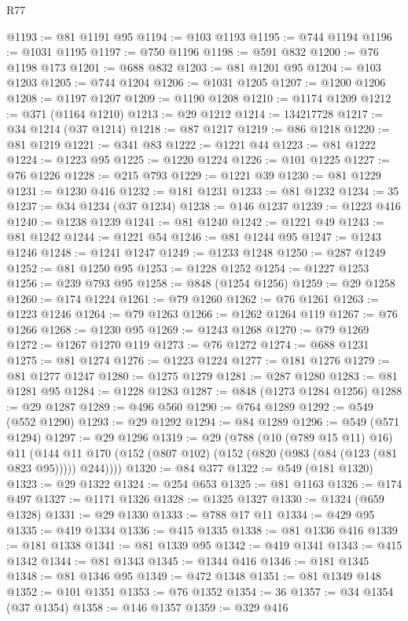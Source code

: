 \begin{lexlean}{R77}
\begin{coremodule}
@1193 := @81 @1191 @95
@1194 := @103 @1193
@1195 := @744 @1194
@1196 := @1031 @1195
@1197 := @750 @1196
@1198 := @591 @832
@1200 := @76 @1198 @173
@1201 := @688 @832
@1203 := @81 @1201 @95
@1204 := @103 @1203
@1205 := @744 @1204
@1206 := @1031 @1205
@1207 := @1200 @1206
@1208 := @1197 @1207
@1209 := @1190 @1208
@1210 := @1174 @1209
@1212 := @371 (@1164 @1210)
@1213 := @29 @1212
@1214 := 134217728
@1217 := @34 @1214 (@37 @1214)
@1218 := @87 @1217
@1219 := @86 @1218
@1220 := @81 @1219
@1221 := @341 @83
@1222 := @1221 @44
@1223 := @81 @1222
@1224 := @1223 @95
@1225 := @1220 @1224
@1226 := @101 @1225
@1227 := @76 @1226
@1228 := @215 @793
@1229 := @1221 @39
@1230 := @81 @1229
@1231 := @1230 @416
@1232 := @181 @1231
@1233 := @81 @1232
@1234 := 35
@1237 := @34 @1234 (@37 @1234)
@1238 := @146 @1237
@1239 := @1223 @416
@1240 := @1238 @1239
@1241 := @81 @1240
@1242 := @1221 @49
@1243 := @81 @1242
@1244 := @1221 @54
@1246 := @81 @1244 @95
@1247 := @1243 @1246
@1248 := @1241 @1247
@1249 := @1233 @1248
@1250 := @287 @1249
@1252 := @81 @1250 @95
@1253 := @1228 @1252
@1254 := @1227 @1253
@1256 := @239 @793 @95
@1258 := @848 (@1254 @1256)
@1259 := @29 @1258
@1260 := @174 @1224
@1261 := @79 @1260
@1262 := @76 @1261
@1263 := @1223 @1246
@1264 := @79 @1263
@1266 := @1262 @1264 @119
@1267 := @76 @1266
@1268 := @1230 @95
@1269 := @1243 @1268
@1270 := @79 @1269
@1272 := @1267 @1270 @119
@1273 := @76 @1272
@1274 := @688 @1231
@1275 := @81 @1274
@1276 := @1223 @1224
@1277 := @181 @1276
@1279 := @81 @1277 @1247
@1280 := @1275 @1279
@1281 := @287 @1280
@1283 := @81 @1281 @95
@1284 := @1228 @1283
@1287 := @848 (@1273 @1284 @1256)
@1288 := @29 @1287
@1289 := @496 @560
@1290 := @764 @1289
@1292 := @549 (@552 @1290)
@1293 := @29 @1292
@1294 := @84 @1289
@1296 := @549 (@571 @1294)
@1297 := @29 @1296
@1319 := @29
    (@788
      (@10 (@789 @15 @11) @16)
      @11
      (@144 @11 @170 (@152 (@807 @102) (@152 (@820 (@983 (@84 (@123 (@81 @823 @95))))) @244))))
@1320 := @84 @377
@1322 := @549 (@181 @1320)
@1323 := @29 @1322
@1324 := @254 @653
@1325 := @81 @1163
@1326 := @174 @497
@1327 := @1171 @1326
@1328 := @1325 @1327
@1330 := @1324 (@659 @1328)
@1331 := @29 @1330
@1333 := @788 @17 @11
@1334 := @429 @95
@1335 := @419 @1334
@1336 := @415 @1335
@1338 := @81 @1336 @416
@1339 := @181 @1338
@1341 := @81 @1339 @95
@1342 := @419 @1341
@1343 := @415 @1342
@1344 := @81 @1343
@1345 := @1344 @416
@1346 := @181 @1345
@1348 := @81 @1346 @95
@1349 := @472 @1348
@1351 := @81 @1349 @148
@1352 := @101 @1351
@1353 := @76 @1352
@1354 := 36
@1357 := @34 @1354 (@37 @1354)
@1358 := @146 @1357
@1359 := @329 @416

\end{coremodule}
\end{lexlean}
